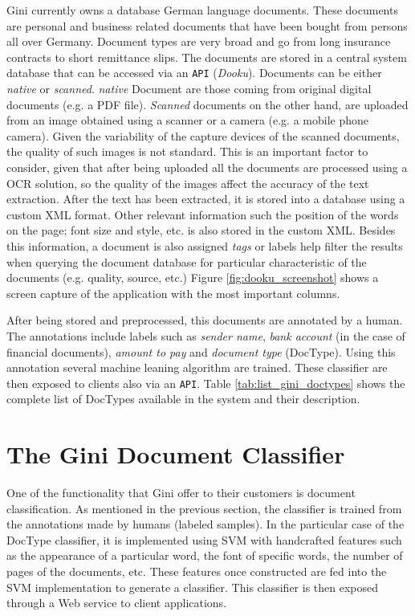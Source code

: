 Gini currently owns a database  German language documents. These documents 
are personal and business related documents that have been bought 
from  persons all over Germany. Document types are very broad and go from
long insurance contracts to short remittance slips. The documents are stored
in a central system database that can be accessed via an  \texttt{API} (\textsl{Dooku}).
Documents can be either \textit{native} or \textit{scanned}. 
\textit{native} Document are those  coming  from original digital documents (e.g. a
PDF file). \textit{Scanned} documents on the other hand, are uploaded
from an image obtained using a scanner or a camera (e.g. a mobile phone 
camera). Given the variability of the capture devices of the scanned
documents, the quality of such images is not standard.
This is an important factor to consider, given that after being uploaded all the
documents are processed using a \ac{OCR} solution, so the quality of the
images affect the accuracy of the text extraction. 
After the text has been extracted, it is stored  into a database using a custom
\textsc{XML} format. Other relevant information such the position of the
words on the page; font size and style, etc.  is also stored in the custom
\textsc{XML}.  Besides this information, a document is also assigned
\textit{tags} or labels help filter the results  when querying the document database for
particular characteristic of the documents
(e.g. quality, source, etc.)   Figure \ref{fig:dooku_screenshot} shows a screen capture of the application with the
most important columns.


After being stored and preprocessed, this documents are annotated by a human.
The annotations include labels such as  \textit{sender name}, \textit{bank
  account} (in the case of financial documents), \textit{amount to pay} and
\textit{document type} (\ac{DocType}). Using this annotation several
machine leaning algorithm are trained.  These classifier are then exposed to
clients also via an \texttt{API}. Table \ref{tab:list_gini_doctypes} shows the
complete list of \ac{DocType}s available in the system and their description.


\section{The Gini Document Classifier}  
\label{sec:gini_doctype_classifier}

One of the functionality that Gini offer to their customers is document
classification.  As mentioned in the previous section, the classifier is trained from  the annotations
made by humans (labeled samples). In the particular
case of the \ac{DocType} classifier, it is implemented using \ac{SVM} with
handcrafted features such as the appearance of a particular word, the font
of specific words, the number of pages of the documents, etc. These features
once constructed are fed into the \ac{SVM} implementation to generate a classifier. This
classifier is then exposed through a Web service to client applications.

